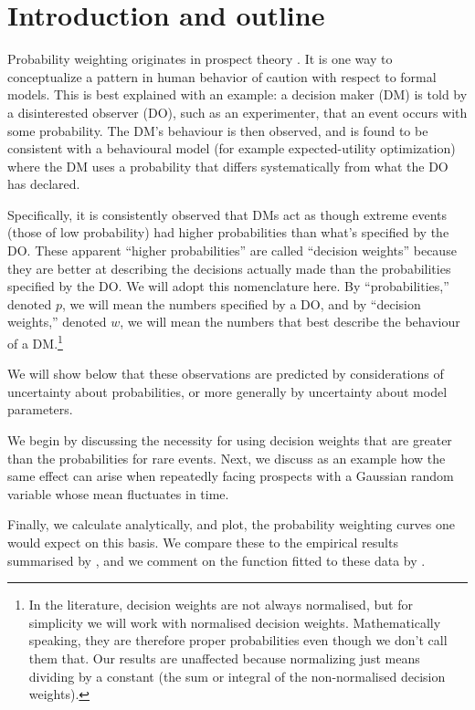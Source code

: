\documentclass[11pt]{article}
\numberwithin{equation}{section}
\begin{document}
\section{Introduction and outline}
Probability weighting originates in prospect theory  \citep{Barberis2013}. It is one way to conceptualize a pattern in human behavior of caution with respect to formal models. This is best explained with an example: a decision maker (DM) is told by a disinterested observer (DO), such as an experimenter, that an event occurs with some probability. The DM's behaviour is then observed, and is found to be consistent with a behavioural model (for example expected-utility optimization) where the DM uses a probability that differs systematically from what the DO has declared. 

Specifically, it is consistently observed that DMs act as though extreme events (those of low probability) had higher probabilities than what's specified by the DO. These apparent ``higher probabilities'' are called ``decision weights'' because they are better at describing the decisions actually made than the probabilities specified by the DO. We will adopt this nomenclature here. By ``probabilities,'' denoted $p$, we will mean the numbers specified by a DO, and by ``decision weights,'' denoted $w$, we will mean the numbers that best describe the behaviour of a DM.\footnote{In the literature, decision weights are not always normalised, but for simplicity we will work with normalised decision weights. Mathematically speaking, they are therefore proper probabilities even though we don't call them that. Our results are unaffected because normalizing just means dividing by a constant (the sum or integral of the non-normalised decision weights).}

We will show below that these observations are predicted by considerations of uncertainty about probabilities, or more generally by uncertainty about model parameters. 

We begin by discussing the necessity for using decision weights that are greater than the probabilities for rare events. Next, we discuss as an example how the same effect can arise when repeatedly facing prospects with a Gaussian random variable whose mean fluctuates in time.

Finally, we calculate analytically, and plot, the probability weighting curves one would expect on this basis. We compare these to the empirical results summarised by \citet{Barberis2013}, and we comment on the function fitted to these data by \citet{TverskyKahneman1992}.
\end{document}
